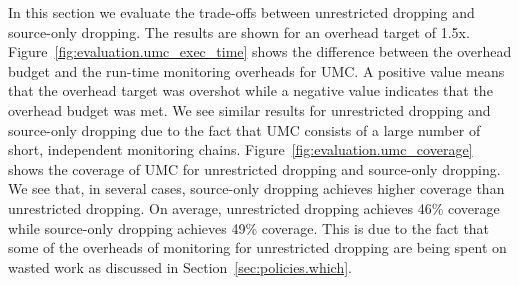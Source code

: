 In this section we evaluate the trade-offs between unrestricted dropping and source-only dropping.
The results are shown for an overhead target of 1.5x.
Figure~\ref{fig:evaluation.umc_exec_time} shows the difference between the
overhead budget and the run-time monitoring overheads for UMC. A positive value
means that the overhead target was overshot while a negative value indicates
that the overhead budget was met. We see similar results for unrestricted
dropping and source-only dropping due to the fact that UMC consists of a large
number of short, independent monitoring chains.
Figure~\ref{fig:evaluation.umc_coverage} shows the coverage of UMC for
unrestricted dropping and source-only dropping. We see that, in several cases, source-only dropping
achieves higher coverage than unrestricted dropping. On average, unrestricted
dropping achieves 46\% coverage while source-only dropping achieves 49\%
coverage. This is due
to the fact that some of the overheads of monitoring for unrestricted dropping
are being spent on wasted work as discussed in Section~\ref{sec:policies.which}.

% 

